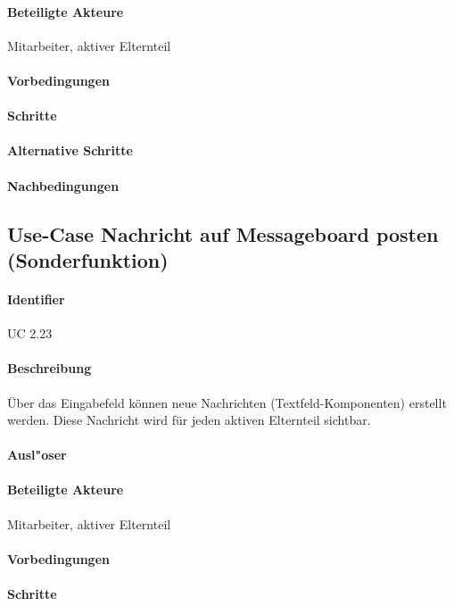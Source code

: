   \paragraph{Beteiligte Akteure}   \leavevmode \newline
    Mitarbeiter, aktiver Elternteil
  \paragraph{Vorbedingungen}
  \paragraph{Schritte}
  \paragraph{Alternative Schritte}
  \paragraph{Nachbedingungen}

  
  \newpage
 \subsection{Use-Case Nachricht auf Messageboard posten (Sonderfunktion)}
  \paragraph{Identifier}
  UC 2.23
  \paragraph{Beschreibung}
  Über das Eingabefeld können neue Nachrichten (Textfeld-Komponenten) erstellt werden. Diese Nachricht wird für jeden aktiven Elternteil sichtbar.
  \paragraph{Ausl"oser}
  \paragraph{Beteiligte Akteure}   \leavevmode \newline
    Mitarbeiter, aktiver Elternteil
  \paragraph{Vorbedingungen}
  \paragraph{Schritte}
